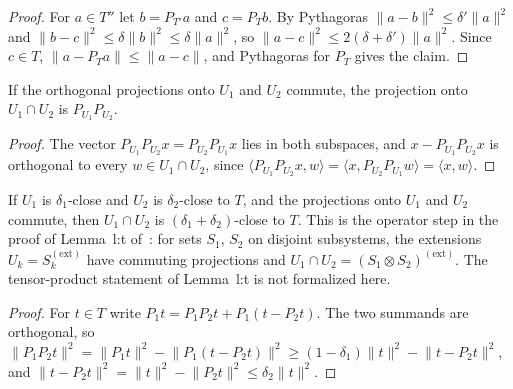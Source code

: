 \begin{proof}
    \leanok
    For $a\in T''$ let $b=P_{T'}a$ and $c=P_Tb$. By Pythagoras
    $\lVert a-b\rVert^2\le\delta'\lVert a\rVert^2$ and
    $\lVert b-c\rVert^2\le\delta\lVert b\rVert^2\le\delta\lVert a\rVert^2$, so
    $\lVert a-c\rVert^2\le2(\delta+\delta')\lVert a\rVert^2$. Since $c\in T$,
    $\lVert a-P_Ta\rVert\le\lVert a-c\rVert$, and Pythagoras for $P_T$ gives
    the claim.
\end{proof}

\begin{theorem}
    \label{thm:subspace_inf_projection}
    \leanok
    If the orthogonal projections onto $U_1$ and $U_2$ commute, the
    projection onto $U_1\cap U_2$ is $P_{U_1}P_{U_2}$.
\end{theorem}

\begin{proof}
    \leanok
    The vector $P_{U_1}P_{U_2}x=P_{U_2}P_{U_1}x$ lies in both subspaces, and
    $x-P_{U_1}P_{U_2}x$ is orthogonal to every $w\in U_1\cap U_2$, since
    $\langle P_{U_1}P_{U_2}x,w\rangle=\langle x,P_{U_2}P_{U_1}w\rangle
        =\langle x,w\rangle$.
\end{proof}

\begin{theorem}
    \label{thm:subspace_close_inf}
    \leanok
    If $U_1$ is $\delta_1$-close and $U_2$ is $\delta_2$-close to $T$, and
    the projections onto $U_1$ and $U_2$ commute, then $U_1\cap U_2$ is
    $(\delta_1+\delta_2)$-close to $T$. This is the operator step in the
    proof of Lemma~l:t of~\cite[lines 506--523]{Arad2016RigorousRG}: for
    sets $S_1$, $S_2$ on disjoint subsystems, the extensions
    $U_k=S_k^{(\mathrm{ext})}$ have commuting projections and
    $U_1\cap U_2=(S_1\otimes S_2)^{(\mathrm{ext})}$. The tensor-product
    statement of Lemma~l:t is not formalized here.
\end{theorem}

\begin{proof}
    \leanok
    For $t\in T$ write $P_1t=P_1P_2t+P_1(t-P_2t)$. The two summands are
    orthogonal, so
    $\lVert P_1P_2t\rVert^2=\lVert P_1t\rVert^2-\lVert P_1(t-P_2t)\rVert^2
        \ge(1-\delta_1)\lVert t\rVert^2-\lVert t-P_2t\rVert^2$, and
    $\lVert t-P_2t\rVert^2=\lVert t\rVert^2-\lVert P_2t\rVert^2
        \le\delta_2\lVert t\rVert^2$.
\end{proof}


